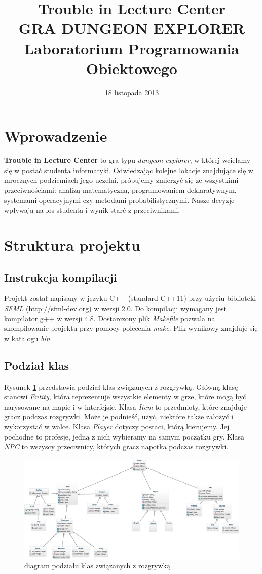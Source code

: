 \documentclass[10pt,a4paper]{article}
\author{\authorthing}
\date{18 listopada 2013}
\title{Trouble in Lecture Center\\\small{\MakeUppercase{Gra dungeon explorer}}\\\Large{Laboratorium Programowania Obiektowego}}
\begin{document}
\maketitle


\section{Wprowadzenie}
\textbf{Trouble in Lecture Center} to gra typu \textit{dungeon explorer}, w której wcielamy się w postać studenta informatyki. Odwiedzając kolejne lokacje znajdujące się w mrocznych podziemiach jego uczelni, próbujemy zmierzyć się ze wszystkimi przeciwnościami: analizą matematyczną, programowaniem deklaratywnym, systemami operacyjnymi czy metodami probabilistycznymi. Nasze decyzje wpływają na los studenta i wynik starć z przeciwnikami.


\section{Struktura projektu}
\subsection{Instrukcja kompilacji}
Projekt został napisany w języku C++ (standard C++11) przy użyciu biblioteki \textit{SFML} (http://sfml-dev.org) w wersji 2.0. Do kompilacji wymagany jest kompilator g++ w wersji 4.8. Dostarczony plik \textit{Makefile} pozwala na skompilowanie projektu przy pomocy polecenia \textit{make}. Plik wynikowy znajduje się w katalogu \textit{bin}. 

\subsection{Podział klas}
Rysunek \ref{uml-game} przedstawia podział klas związanych z rozgrywką. Główną klasę stanowi \textit{Entity}, która reprezentuje wszystkie elementy w grze, które mogą być narysowane na mapie i w interfejsie. Klasa \textit{Item} to przedmioty, które znajduje gracz podczas rozgrywki. Może je podnieść, użyć, niektóre także założyć i wykorzystać w walce. Klasa \textit{Player} dotyczy postaci, którą kierujemy. Jej pochodne to profesje, jedną z nich wybieramy na samym początku gry. Klasa \textit{NPC} to wszyscy przeciwnicy, których gracz napotka podczas rozgrywki. 
\begin{figure}
    \centering
    \includegraphics[width=\textwidth]{doc/uml/lc-ex-diag.pdf}
    \caption{diagram podziału klas związanych z rozgrywką}
    \label{uml-game}
\end{figure}
\end{document}
